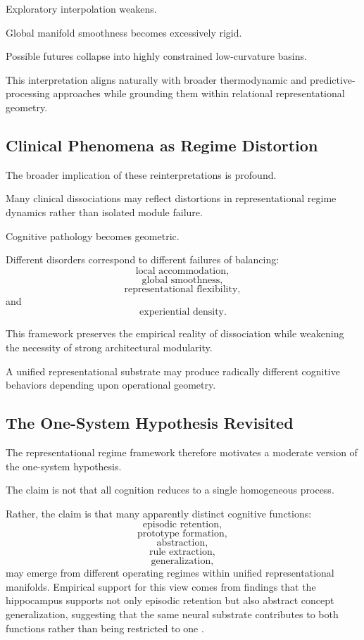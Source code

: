 \documentclass[12pt,a4paper]{article}
\begin{document}
Exploratory interpolation weakens.

Global manifold smoothness becomes excessively rigid.

Possible futures collapse into highly constrained low-curvature basins.

This interpretation aligns naturally with broader thermodynamic and predictive-processing approaches while grounding them within relational representational geometry.

\subsection{Clinical Phenomena as Regime Distortion}

The broader implication of these reinterpretations is profound.

Many clinical dissociations may reflect distortions in representational regime dynamics rather than isolated module failure.

Cognitive pathology becomes geometric.

Different disorders correspond to different failures of balancing:
\[
\text{local accommodation},
\]
\[
\text{global smoothness},
\]
\[
\text{representational flexibility},
\]
and
\[
\text{experiential density}.
\]

This framework preserves the empirical reality of dissociation while weakening the necessity of strong architectural modularity.

A unified representational substrate may produce radically different cognitive behaviors depending upon operational geometry.

\subsection{The One-System Hypothesis Revisited}

The representational regime framework therefore motivates a moderate version of the one-system hypothesis.

The claim is not that all cognition reduces to a single homogeneous process.

Rather, the claim is that many apparently distinct cognitive functions:
\[
\text{episodic retention},
\]
\[
\text{prototype formation},
\]
\[
\text{abstraction},
\]
\[
\text{rule extraction},
\]
\[
\text{generalization},
\]
may emerge from different operating regimes within unified representational manifolds. Empirical support for this view comes from findings that the hippocampus supports not only episodic retention but also abstract concept generalization, suggesting that the same neural substrate contributes to both functions rather than being restricted to one \cite{BowmanZeithamova2018}.
\end{document}
